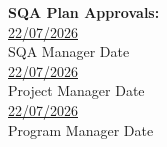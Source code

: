 \begin{titlepage}
    \vfill
    \begin{flushleft}
        \textbf{SQA Plan Approvals:}\\
        \vspace{0.3cm}
        \underline{\hspace{4cm}} \hspace{1cm} \underline{22/07/2026}\\
        SQA Manager \hspace{2.8cm} Date\\
        \vspace{0.3cm}
        \underline{\hspace{4cm}} \hspace{1cm} \underline{22/07/2026}\\
        Project Manager \hspace{2.4cm} Date\\
        \vspace{0.3cm}
        \underline{\hspace{4cm}} \hspace{1cm} \underline{22/07/2026}\\
        Program Manager \hspace{2.3cm} Date\\
    \end{flushleft}
\end{titlepage}
